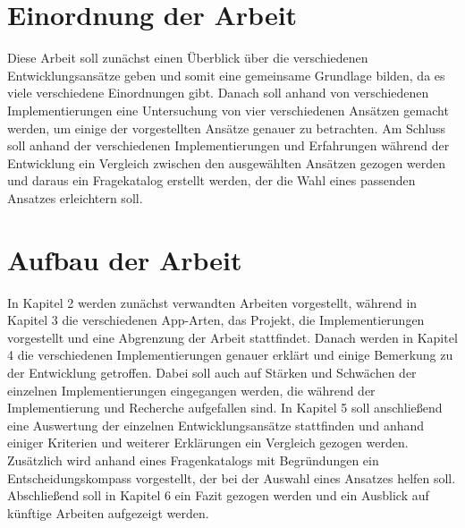 \section{Einordnung der Arbeit}
Diese Arbeit soll zunächst einen Überblick über die verschiedenen Entwicklungsansätze geben und somit eine gemeinsame Grundlage bilden, da es viele verschiedene Einordnungen gibt.
Danach soll anhand von verschiedenen Implementierungen eine Untersuchung von vier verschiedenen Ansätzen gemacht werden, um einige der vorgestellten Ansätze genauer zu betrachten.
Am Schluss soll anhand der verschiedenen Implementierungen und Erfahrungen während der Entwicklung ein Vergleich zwischen den ausgewählten Ansätzen gezogen werden und daraus ein Fragekatalog erstellt werden, der die Wahl eines passenden Ansatzes erleichtern soll.


\section{Aufbau der Arbeit}
In Kapitel 2 werden zunächst verwandten Arbeiten vorgestellt, während in Kapitel 3 die verschiedenen App-Arten, das Projekt, die Implementierungen vorgestellt und eine Abgrenzung der Arbeit stattfindet.
Danach werden in Kapitel 4 die verschiedenen Implementierungen genauer erklärt und einige Bemerkung zu der Entwicklung getroffen. Dabei soll auch auf Stärken und Schwächen der einzelnen Implementierungen eingegangen werden, die während der Implementierung und Recherche aufgefallen sind.
In Kapitel 5 soll anschließend eine Auswertung der einzelnen Entwicklungsansätze stattfinden und anhand einiger Kriterien und weiterer Erklärungen ein Vergleich gezogen werden. Zusätzlich wird anhand eines Fragenkatalogs mit Begründungen ein Entscheidungskompass vorgestellt, der bei der Auswahl eines Ansatzes helfen soll. Abschließend soll in Kapitel 6 ein Fazit gezogen werden und ein Ausblick auf künftige Arbeiten aufgezeigt werden.